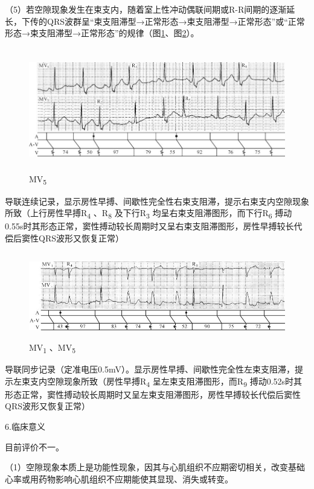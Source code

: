 （5）若空隙现象发生在束支内，随着室上性冲动偶联间期或R-R间期的逐渐延长，下传的QRS波群呈“束支阻滞型→正常形态→束支阻滞型→正常形态”或“正常形态→束支阻滞型→正常形态”的规律（图\ref{fig28-12}、图\ref{fig28-13}）。

\begin{figure}[!htbp]
 \centering
 \includegraphics[width=5.79167in,height=2.125in]{./images/Image00473.jpg}
 \captionsetup{justification=centering}
 \caption{MV\textsubscript{5}}
 \label{fig28-12}
  \end{figure} 
导联连续记录，显示房性早搏、间歇性完全性右束支阻滞，提示右束支内空隙现象所致（上行房性早搏R\textsubscript{4}
、R\textsubscript{8} 及下行R\textsubscript{3}
均呈右束支阻滞图形，而下行R\textsubscript{6}
搏动0.55s时其形态正常，窦性搏动较长周期时又呈右束支阻滞图形，房性早搏较长代偿后窦性QRS波形又恢复正常）

\begin{figure}[!htbp]
 \centering
 \includegraphics[width=5.55208in,height=1.48958in]{./images/Image00474.jpg}
 \captionsetup{justification=centering}
 \caption{MV\textsubscript{1} 、MV\textsubscript{5}}
 \label{fig28-13}
  \end{figure} 
导联同步记录（定准电压0.5mV）。显示房性早搏、间歇性完全性左束支阻滞，提示左束支内空隙现象所致（房性早搏R\textsubscript{4}
呈左束支阻滞图形，而R\textsubscript{9}
搏动0.52s时其形态正常，窦性搏动较长周期时又呈左束支阻滞图形，房性早搏较长代偿后窦性QRS波形又恢复正常）

6.临床意义

目前评价不一。

（1）空隙现象本质上是功能性现象，因其与心肌组织不应期密切相关，改变基础心率或用药物影响心肌组织不应期能使其显现、消失或转变。

